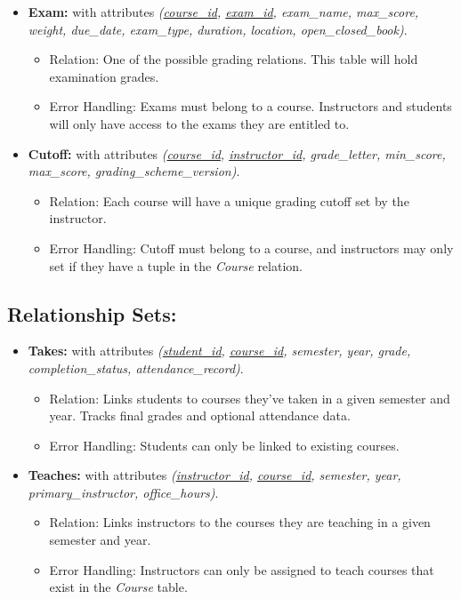 \documentclass[12pt]{article}
\begin{document}
\begin{itemize}
    \item \textbf{Exam:} with attributes \textit{(\underline{course\_id}, \underline{exam\_id}, exam\_name, max\_score, weight, due\_date, exam\_type, duration, location, open\_closed\_book)}.
    \begin{itemize}
        \item Relation: One of the possible grading relations. This table will hold examination grades.
        \item Error Handling: Exams must belong to a course. Instructors and students will only have access to the exams they are entitled to.
    \end{itemize}

    \item \textbf{Cutoff:} with attributes \textit{(\underline{course\_id}, \underline{instructor\_id}, grade\_letter, min\_score, max\_score, grading\_scheme\_version)}.
    \begin{itemize}
        \item Relation: Each course will have a unique grading cutoff set by the instructor.
        \item Error Handling: Cutoff must belong to a course, and instructors may only set if they have a tuple in the \textit{Course} relation.
    \end{itemize}
\end{itemize}

\subsection*{Relationship Sets:}

\begin{itemize}
    \item \textbf{Takes:} with attributes \textit{(\underline{student\_id}, \underline{course\_id}, semester, year, grade, completion\_status, attendance\_record)}.
    \begin{itemize}
        \item Relation: Links students to courses they've taken in a given semester and year. Tracks final grades and optional attendance data.
        \item Error Handling: Students can only be linked to existing courses.
    \end{itemize}

    \item \textbf{Teaches:} with attributes \textit{(\underline{instructor\_id}, \underline{course\_id}, semester, year, primary\_instructor, office\_hours)}.
    \begin{itemize}
        \item Relation: Links instructors to the courses they are teaching in a given semester and year.
        \item Error Handling: Instructors can only be assigned to teach courses that exist in the \textit{Course} table.
    \end{itemize}
\end{itemize}
\end{document}

